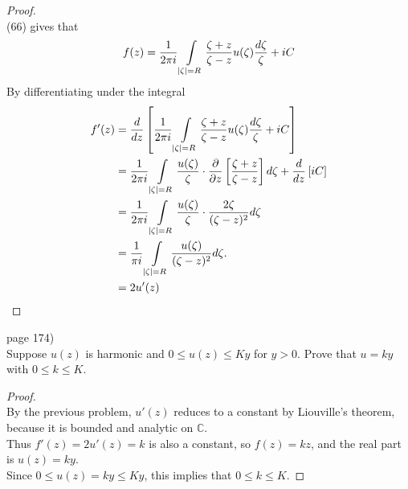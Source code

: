 \documentclass{article}
\newenvironment{problem}[2][Problem]{\begin{trivlist}
\item[\hskip \labelsep {\bfseries #1}\hskip \labelsep {\bfseries #2.}]}{\end{trivlist}}
\begin{document}
\begin{proof} \text{} \\
  (66) gives that \[
    f(z) = \frac{1}{2\pi i} \int\displaylimits_{|\zeta| = R}
      \frac{\zeta + z}{\zeta - z} u(\zeta) \frac{d\zeta}{\zeta}
      + iC
  \]
  By differentiating under the integral \begin{align*}
    f'(z) &= \frac{d}{dz} \left[
      \frac{1}{2\pi i} \int\displaylimits_{|\zeta| = R}
        \frac{\zeta + z}{\zeta - z} u(\zeta) \frac{d\zeta}{\zeta}
        + iC
    \right]\\
    &=
      \frac{1}{2\pi i} \int\displaylimits_{|\zeta| = R}
        \frac{u(\zeta)}{\zeta} \cdot
        \frac{\partial}{\partial z} \left[
          \frac{\zeta + z}{\zeta - z}
        \right]
      d\zeta
      + \frac{d}{dz}\left[iC\right] \\
    &=
      \frac{1}{2\pi i} \int\displaylimits_{|\zeta| = R}
        \frac{u(\zeta)}{\zeta} \cdot
        \frac{2\zeta}{(\zeta - z)^2}
      d\zeta \\
    &=
      \frac{1}{\pi i} \int\displaylimits_{|\zeta| = R}
        \frac{u(\zeta)}{(\zeta - z)^2}
      d\zeta. \\
    &= 2 u'(z)
  \end{align*}
\end{proof}
\pagebreak

\begin{problem}{5} (page 174) \\
  Suppose $u(z)$ is harmonic and $0 \leq u(z) \leq Ky$ for $y > 0$. Prove that
  $u = ky$ with $0 \leq k \leq K$.
\end{problem}

\begin{proof} \text{} \\
  By the previous problem, $u'(z)$ reduces to a constant by Liouville's theorem,
  because it is bounded and analytic on $\mathbb{C}$.\\
  Thus $f'(z) = 2u'(z) = k$ is also a constant, so $f(z) = kz$, and the real
  part is $u(z) = ky$.\\Since $0 \leq u(z) = ky \leq Ky$, this implies that
  $0 \leq k \leq K$.
\end{proof}
\pagebreak
\end{document}
